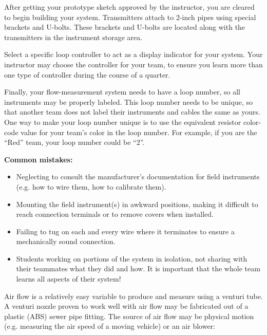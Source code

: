 \documentclass[12pt,a4paper]{article}
\begin{document}
\begin{itemize}
After getting your prototype sketch approved by the instructor, you are cleared to begin building your system.  Transmitters attach to 2-inch pipes using special brackets and U-bolts.  These brackets and U-bolts are located along with the transmitters in the instrument storage area.  

Select a specific loop controller to act as a display indicator for your system.  Your instructor may choose the controller for your team, to ensure you learn more than one type of controller during the course of a quarter.

Finally, your flow-measurement system needs to have a loop number, so all instruments may be properly labeled.  This loop number needs to be unique, so that another team does not label their instruments and cables the same as yours.  One way to make your loop number unique is to use the equivalent resistor color-code value for your team's color in the loop number.  For example, if you are the ``Red'' team, your loop number could be ``2''. 

\vskip 10pt

{\bf Common mistakes:}

\begin{itemize}
\item{} Neglecting to consult the manufacturer's documentation for field instruments (e.g. how to wire them, how to calibrate them).
\item{} Mounting the field instrument(s) in awkward positions, making it difficult to reach connection terminals or to remove covers when installed.
\item{} Failing to tug on each and every wire where it terminates to ensure a mechanically sound connection.
\item{} Students working on portions of the system in isolation, not sharing with their teammates what they did and how.  It is important that the whole team learns all aspects of their system!
\end{itemize}

\vfil \eject

Air flow is a relatively easy variable to produce and measure using a venturi tube.  A venturi nozzle proven to work well with air flow may be fabricated out of a plastic (ABS) sewer pipe fitting.  The source of air flow may be physical motion (e.g. measuring the air speed of a moving vehicle) or an air blower:


\end{itemize}
\end{document}
